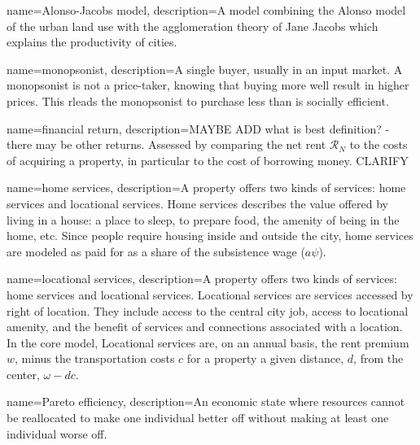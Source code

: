 
{
name=Alonso-Jacobs model,
description={A model combining the \gls{Alonso model} of the urban land use  \cite{alonsoModelUrbanLand1960} with the \gls{agglomeration} theory of Jane Jacobs \cite{jacobsEconomyCities1969} which explains the productivity of cities.}
}

{
name=monopsonist,
description={A single buyer, usually in an input market. A monopsonist is not a price-taker, knowing that buying more well result in  higher prices. This rleads the monopsonist to purchase less than is socially efficient.}
}

{
name=financial return,
description={MAYBE ADD what is best definition? - there may be other returns. Assessed by comparing the net rent $\mathcal{R}_N$ to the costs of acquiring a property, in particular to the cost of borrowing money. CLARIFY}
}

{
name=home services,
description={A property offers two kinds of services: home services and \gls{locational services}. Home services describes the value offered by living in a house: a place to sleep, to prepare food, the amenity of being in the home, etc. Since people require housing inside and outside the city, home services are modeled as paid for as a share of the subsistence wage ($a \psi$).}
}

{
name=locational services,
description={A property offers two kinds of services: \gls{home services} and locational services. Locational services are services accessed by right of location. They include access to the central city job, access to locational amenity, and the benefit of services and connections associated with a location. In the core model, Locational services are, on an annual basis, the rent premium $w$, minus the transportation costs $c$ for a property a given distance, $d$, from the center, $\omega- {dc}$.}
}


{
name=Pareto efficiency,
description={An economic state where resources cannot be reallocated to make one individual better off without making at least one individual worse off.}
}

